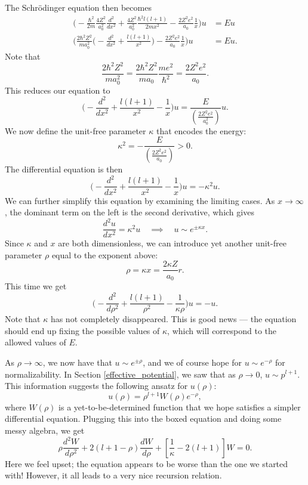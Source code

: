 The Schrödinger equation then becomes \begin{align*}\bigg(-\frac{\hbar^2}{2m}\frac{4Z^2}{a_0^2}\frac{d^2}{dx^2}+\frac{4Z^2}{a_0^2}\frac{\hbar^2l(l+1)}{2mx^2}-\frac{2Z^2e^2}{a_0}\frac{1}{x}\bigg)u&=Eu\\ \bigg(\frac{2\hbar^2Z^2}{ma_0^2}\bigg(-\frac{d^2}{dx^2}+\frac{l(l+1)}{x^2}\bigg)-\frac{2Z^2e^2}{a_0}\frac{1}{x}\bigg)u&=Eu. \end{align*}Note that $$\frac{2\hbar^2Z^2}{ma_0^2}=\frac{2\hbar^2Z^2}{ma_0}\frac{me^2}{\hbar^2}=\frac{2Z^2e^2}{a_0}.$$This reduces our equation to $$\bigg(-\frac{d^2}{dx^2}+\frac{l(l+1)}{x^2}-\frac{1}{x}\bigg)u=\frac{E}{(\frac{2Z^2e^2}{a_0^2})}u.$$We now define the unit-free parameter $\kappa$ that encodes the energy: $$\kappa^2=-\frac{E}{{(\frac{2Z^2e^2}{a_0})}}>0.$$The differential equation is then $$\bigg(-\frac{d^2}{dx^2}+\frac{l(l+1)}{x^2}-\frac{1}{x}\bigg)u=-\kappa^2 u.$$We can further simplify this equation by examining the limiting cases. As $x\to\infty$, the dominant term on the left is the second derivative, which gives $$\frac{d^2u}{dx^2}=\kappa^2 u\quad\implies\quad u\sim e^{\pm\kappa x}.$$Since $\kappa$ and $x$ are both dimensionless, we can introduce yet another unit-free parameter $\rho$ equal to the exponent above: $$\rho=\kappa x=\frac{2\kappa Z}{a_0}r.$$This time we get $$\boxed{\bigg(-\frac{d^2}{d\rho^2}+\frac{l(l+1)}{\rho^2}-\frac{1}{\kappa\rho}\bigg)u=-u.}$$Note that $\kappa$ has not completely disappeared. This is good news --- the equation should end up fixing the possible values of $\kappa$, which will correspond to the allowed values of $E$.

As $\rho\to\infty$, we now have that $u\sim e^{\pm\rho}$, and we of course hope for $u\sim e^{-\rho}$ for normalizability. In Section \ref{effective_potential}, we saw that as $\rho\to0$, $u\sim p^{l+1}$. This information suggests the following ansatz for $u(\rho)$: $$u(\rho)=\rho^{l+1}W(\rho)e^{-\rho},$$where $W(\rho)$ is a yet-to-be-determined function that we hope satisfies a simpler differential equation. Plugging this into the boxed equation and doing some messy algebra, we get $$\boxed{\rho\frac{d^2W}{d\rho^2}+2(l+1-\rho)\frac{dW}{d\rho}+[\frac{1}{\kappa}-2(l+1)]W=0.}$$Here we feel upset; the equation appears to be worse than the one we started with! However, it all leads to a very nice recursion relation.

